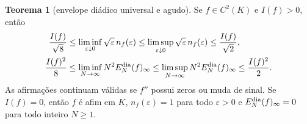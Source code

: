 \documentclass[12pt,a4paper]{article}
\theoremstyle{preciso}
\theoremstyle{definition}
\theoremstyle{preciso}
\newtheorem{theorem}[teorema]{Teorema}
\theoremstyle{preciso}
\theoremstyle{preciso}
\theoremstyle{preciso}
\theoremstyle{definition}
\theoremstyle{preciso}
\theoremstyle{definition}
\theoremstyle{preciso}
\theoremstyle{preciso}
\theoremstyle{definition}
\begin{document}
\begin{theorem}[envelope diádico universal e agudo]\label{map:artigo_2:11.3}
\label{artigo_2:thm:general-dyadic-envelope}
Se $f\in C^2(K)$ e $I(f)>0$, então
\begin{align}
 \frac{I(f)}{\sqrt8}
 &\le \liminf_{\varepsilon\downarrow0}
       \sqrt\varepsilon\,n_f(\varepsilon)
 \le \limsup_{\varepsilon\downarrow0}
       \sqrt\varepsilon\,n_f(\varepsilon)
 \le \frac{I(f)}{\sqrt2},
 \label{artigo_2:eq:threshold-envelope}\\
 \frac{I(f)^2}{8}
 &\le \liminf_{N\to\infty}N^2E_N^{\rm dia}(f)_\infty
 \le \limsup_{N\to\infty}N^2E_N^{\rm dia}(f)_\infty
 \le \frac{I(f)^2}{2}.
 \label{artigo_2:eq:budget-envelope}
\end{align}
As afirmações continuam válidas se $f''$ possui zeros ou muda de sinal. Se
$I(f)=0$, então $f$ é afim em $K$, $n_f(\varepsilon)=1$ para todo $\varepsilon>0$ e
$E_N^{\rm dia}(f)_\infty=0$ para todo inteiro $N\ge1$.
\end{theorem}
\end{document}
